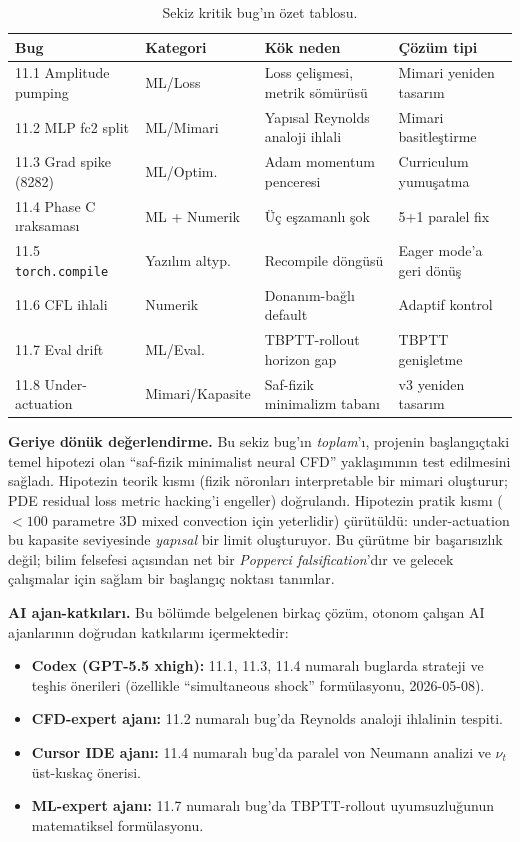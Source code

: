 \begin{table}[H]
\centering
\small
\begin{tabular}{p{3cm}p{3cm}p{4cm}p{3cm}}
\toprule
Bug & Kategori & Kök neden & Çözüm tipi \\
\midrule
11.1 Amplitude pumping       & ML/Loss        & Loss çelişmesi, metrik sömürüsü       & Mimari yeniden tasarım \\
11.2 MLP fc2 split            & ML/Mimari      & Yapısal Reynolds analoji ihlali        & Mimari basitleştirme \\
11.3 Grad spike (8282)        & ML/Optim.      & Adam momentum penceresi                & Curriculum yumuşatma \\
11.4 Phase C ıraksaması       & ML + Numerik   & Üç eşzamanlı şok                       & 5+1 paralel fix \\
11.5 \texttt{torch.compile}   & Yazılım altyp. & Recompile döngüsü                      & Eager mode'a geri dönüş \\
11.6 CFL ihlali              & Numerik        & Donanım-bağlı default                  & Adaptif kontrol \\
11.7 Eval drift               & ML/Eval.       & TBPTT-rollout horizon gap              & TBPTT genişletme \\
11.8 Under-actuation          & Mimari/Kapasite& Saf-fizik minimalizm tabanı            & v3 yeniden tasarım \\
\bottomrule
\end{tabular}
\caption{Sekiz kritik bug'ın özet tablosu.}
\label{tab:bug_summary}
\end{table}

\textbf{Geriye dönük değerlendirme.} Bu sekiz bug'ın \textit{toplam}'ı, projenin başlangıçtaki temel hipotezi olan ``saf-fizik minimalist neural CFD'' yaklaşımının test edilmesini sağladı. Hipotezin teorik kısmı (fizik nöronları interpretable bir mimari oluşturur; PDE residual loss metric hacking'i engeller) doğrulandı. Hipotezin pratik kısmı (\,$< 100$ parametre 3D mixed convection için yeterlidir) çürütüldü: under-actuation bu kapasite seviyesinde \textit{yapısal} bir limit oluşturuyor. Bu çürütme bir başarısızlık değil; bilim felsefesi açısından net bir \textit{Popperci falsification}'dır ve gelecek çalışmalar için sağlam bir başlangıç noktası tanımlar.

\textbf{AI ajan-katkıları.} Bu bölümde belgelenen birkaç çözüm, otonom çalışan AI ajanlarının doğrudan katkılarını içermektedir:
\begin{itemize}
    \item \textbf{Codex (GPT-5.5 xhigh):} 11.1, 11.3, 11.4 numaralı buglarda strateji ve teşhis önerileri (özellikle ``simultaneous shock'' formülasyonu, 2026-05-08).
    \item \textbf{CFD-expert ajanı:} 11.2 numaralı bug'da Reynolds analoji ihlalinin tespiti.
    \item \textbf{Cursor IDE ajanı:} 11.4 numaralı bug'da paralel von Neumann analizi ve $\nu_t$ üst-kıskaç önerisi.
    \item \textbf{ML-expert ajanı:} 11.7 numaralı bug'da TBPTT-rollout uyumsuzluğunun matematiksel formülasyonu.
\end{itemize}

